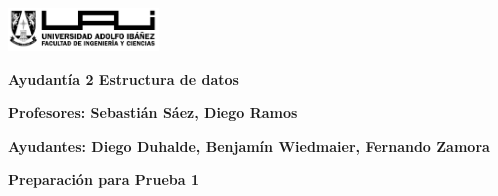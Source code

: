 \documentclass[12pt]{article}
\begin{document}
    \begin{titlepage}
        \centering
        \includegraphics[width=0.3\textwidth]{../imgs/logo-uai-fic.png}
        
        \vspace{0.5cm}
        \textbf{\fontsize{12}{24} Ayudantía 2 Estructura de datos}
        
        \vspace{0.5cm}
        \textbf{\fontsize{12}{24}\selectfont Profesores: Sebastián Sáez, Diego Ramos}
        
        \begin{center}
            \textbf{\fontsize{12}{24}\selectfont Ayudantes: Diego Duhalde, Benjamín Wiedmaier, Fernando Zamora}
        \end{center}

        \textbf{\fontsize{12}{24} Preparación para Prueba 1}


\end{titlepage}
\end{document}

